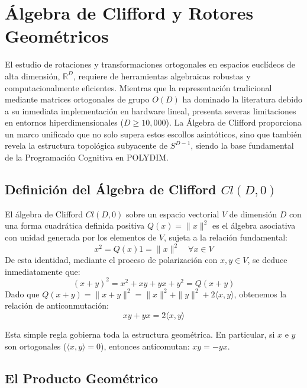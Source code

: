 \chapter{Álgebra de Clifford y Rotores Geométricos}
\label{chap:clifford_rotores}

El estudio de rotaciones y transformaciones ortogonales en espacios euclídeos de alta dimensión, $\mathbb{R}^D$, requiere de herramientas algebraicas robustas y computacionalmente eficientes. Mientras que la representación tradicional mediante matrices ortogonales de grupo $O(D)$ ha dominado la literatura debido a su inmediata implementación en hardware lineal, presenta severas limitaciones en entornos hiperdimensionales ($D \ge 10,000$). La Álgebra de Clifford proporciona un marco unificado que no solo supera estos escollos asintóticos, sino que también revela la estructura topológica subyacente de $S^{D-1}$, siendo la base fundamental de la Programación Cognitiva en POLYDIM.

\section{Definición del Álgebra de Clifford $Cl(D,0)$}

El álgebra de Clifford $Cl(D,0)$ sobre un espacio vectorial $V$ de dimensión $D$ con una forma cuadrática definida positiva $Q(x) = \|x\|^2$ es el álgebra asociativa con unidad generada por los elementos de $V$, sujeta a la relación fundamental:
\begin{equation}
    x^2 = Q(x)1 = \|x\|^2 \quad \forall x \in V
\end{equation}
De esta identidad, mediante el proceso de polarización con $x, y \in V$, se deduce inmediatamente que:
\begin{equation}
    (x+y)^2 = x^2 + xy + yx + y^2 = Q(x+y)
\end{equation}
Dado que $Q(x+y) = \|x+y\|^2 = \|x\|^2 + \|y\|^2 + 2\langle x, y \rangle$, obtenemos la relación de anticonmutación:
\begin{equation}
    xy + yx = 2\langle x, y \rangle
\end{equation}

Esta simple regla gobierna toda la estructura geométrica. En particular, si $x$ e $y$ son ortogonales ($\langle x, y \rangle = 0$), entonces anticomutan: $xy = -yx$.

\section{El Producto Geométrico}

